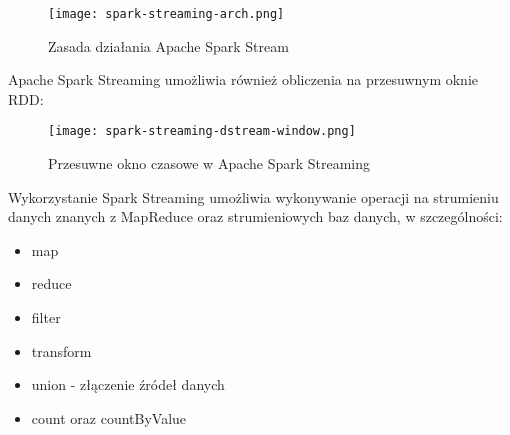 \begin{figure}[h!]
  \centering
    \texttt{[image: spark-streaming-arch.png]}
  \caption{Zasada działania Apache Spark Stream}
  \label{fig:spark-streaming-arch}
\end{figure}

Apache Spark Streaming umożliwia również obliczenia na przesuwnym oknie RDD:

\begin{figure}[h!]
  \centering
    \texttt{[image: spark-streaming-dstream-window.png]}
  \caption{Przesuwne okno czasowe w Apache Spark Streaming}
  \label{fig:spark-streaming-dstream-window}
\end{figure}

Wykorzystanie Spark Streaming umożliwia wykonywanie operacji na strumieniu danych znanych z MapReduce oraz strumieniowych baz danych, w szczególności:

\begin{itemize}[noitemsep]
  \item map
  \item reduce
  \item filter
  \item transform
  \item union - złączenie źródeł danych
  \item count oraz countByValue
\end{itemize}

